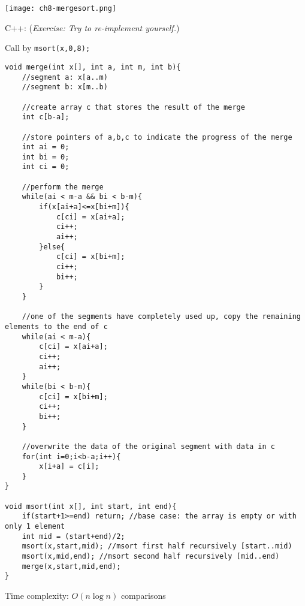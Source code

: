 \texttt{[image: ch8-mergesort.png]}

\pagebreak



C++: (\textit{Exercise: Try to re-implement yourself.})

Call by \texttt{msort(x,0,8);}

\begin{lstlisting}
void merge(int x[], int a, int m, int b){
    //segment a: x[a..m)
    //segment b: x[m..b)

    //create array c that stores the result of the merge 
    int c[b-a];

    //store pointers of a,b,c to indicate the progress of the merge
    int ai = 0;
    int bi = 0; 
    int ci = 0;
    
    //perform the merge
    while(ai < m-a && bi < b-m){
        if(x[ai+a]<=x[bi+m]){
            c[ci] = x[ai+a];
            ci++;
            ai++;
        }else{
            c[ci] = x[bi+m];
            ci++;
            bi++;
        }
    }

    //one of the segments have completely used up, copy the remaining elements to the end of c
    while(ai < m-a){
        c[ci] = x[ai+a];
        ci++;
        ai++;
    }
    while(bi < b-m){
        c[ci] = x[bi+m];
        ci++;
        bi++;
    }

    //overwrite the data of the original segment with data in c
    for(int i=0;i<b-a;i++){
        x[i+a] = c[i];
    }
}

void msort(int x[], int start, int end){
    if(start+1>=end) return; //base case: the array is empty or with only 1 element
    int mid = (start+end)/2;
    msort(x,start,mid); //msort first half recursively [start..mid)
    msort(x,mid,end); //msort second half recursively [mid..end)
    merge(x,start,mid,end);
}
\end{lstlisting}

Time complexity: $O(n\log n)$ comparisons
\vspace{6mm}

